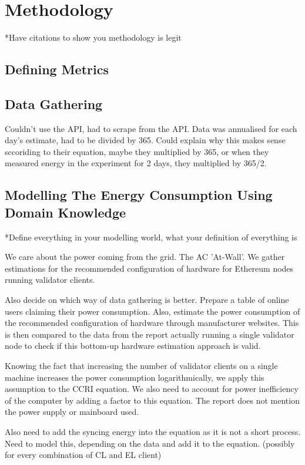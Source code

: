 \chapter {Methodology}
*Have citations to show you methodology is legit

\section {Defining Metrics}


\section {Data Gathering}

Couldn't use the API, had to scrape from the API. Data was annualised for each day's estimate, had to be divided by 365. Could explain why this makes sense sccoriding to their equation, maybe they multiplied by 365, or when they measured energy in the experiment for 2 days, they multiplied by 365/2.

\section {Modelling The Energy Consumption Using Domain Knowledge}

*Define everything in your modelling world, what your definition of everything is

We care about the power coming from the grid. The AC 'At-Wall'. We gather estimations for the recommended configuration of hardware for Ethereum nodes running validator clients. 

Also decide on which way of data gathering is better. Prepare a table of online users claiming their power consumption. Also, estimate the power consumption of the recommended configuration of hardware through manufacturer websites. This is then compared to the data from the \cite{CCRI:Network} report actually running a single validator node to check if this bottom-up hardware estimation approach is valid. 

Knowing the fact that increasing the number of validator clients on a single machine increases the power consumption logarithmically, we apply this assumption to the CCRI equation. We also need to account for power inefficiency of the computer by adding a factor to this equation. The report does not mention the power supply or mainboard used.

Also need to add the syncing energy into the equation as it is not a short process. Need to model this, depending on the data and add it to the equation. (possibly for every combination of CL and EL client)


